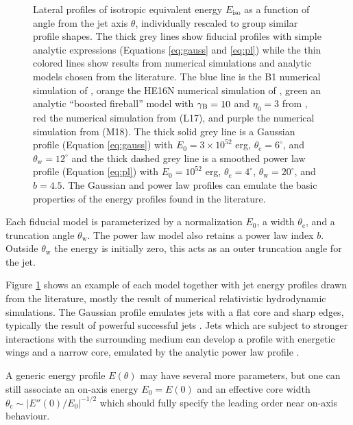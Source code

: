 \documentclass[twocolumn]{aastex62}
\newcommand{\thW}{\ensuremath{\theta_{\mathrm{w}}}}
\newcommand{\thC}{\ensuremath{\theta_{\mathrm{c}}}}
\newcommand{\Eiso}{\ensuremath{E_{\mathrm{iso}}}}
\begin{document}
\begin{figure}
	\caption{Lateral profiles of isotropic equivalent energy $\Eiso$ as a function of angle from the jet axis $\theta$, individually rescaled to group similar profile shapes.  The thick grey lines show fiducial profiles with simple analytic expressions (Equations \eqref{eq:gauss} and \eqref{eq:pl}) while the thin colored lines show results from numerical simulations and analytic models chosen from the literature.  The blue line is the B1 numerical simulation of \cite{Aloy:2005aa}, orange the HE16N numerical simulation of \cite{Mizuta:2009aa}, green an analytic ``boosted fireball'' model with $\gamma_{\rm{B}}=10$ and $\eta_0=3$ from \cite{Duffell:2013aa}, red the numerical simulation from \cite{Lazzati:2017aa} (L17), and purple the numerical simulation from \cite{Margutti:2018aa} (M18).  The thick solid grey line is a Gaussian profile (Equation \eqref{eq:gauss}) with $E_0 = 3\times 10^{52}$ erg, $\thC = 6^\circ$, and $\thW=12^\circ$ and the thick dashed grey line is a smoothed power law profile (Equation \eqref{eq:pl}) with $E_0 = 10^{52}$ erg, $\thC = 4^\circ$, $\thW=20^\circ$, and $b=4.5$.  The Gaussian and power law profiles can emulate the basic properties of the energy profiles found in the literature. \label{fig:jetStruct}}
\end{figure}

Each fiducial model is parameterized by a normalization $E_0$, a width $\thC$, and a truncation angle $\thW$.  The power law model also retains a power law index $b$.  Outside $\thW$ the energy is initially zero, this acts as an outer truncation angle for the jet.   

Figure \ref{fig:jetStruct} shows an example of each model together with jet energy profiles drawn from the literature, mostly the result of numerical relativistic hydrodynamic simulations.  The Gaussian profile emulates jets with a flat core and sharp edges, typically the result of powerful successful jets \citep{Aloy:2005aa, Margutti:2018aa}.  Jets which are subject to stronger interactions with the surrounding medium can develop a profile with energetic wings and a narrow core, emulated by the analytic power law profile \citep{Mizuta:2009aa, Duffell:2013aa, Lazzati:2017aa}.  

A generic energy profile $E(\theta)$ may have several more parameters, but one can still associate an on-axis energy $E_0 = E(0)$ and an effective core width $\thC \sim |E''(0)/E_0|^{-1/2}$ which should fully specify the leading order near on-axis behaviour.  
\end{document}

